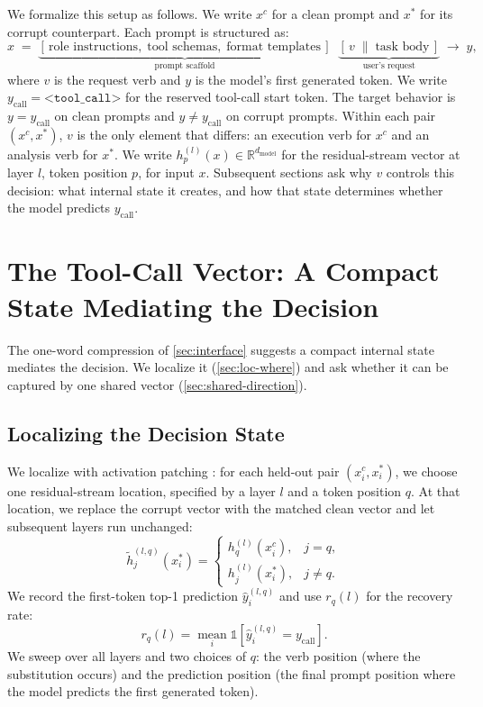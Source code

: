 \documentclass{article}
\begin{document}
We formalize this setup as follows. 
We write $x^c$ for a clean prompt and $x^*$ for its corrupt counterpart. 
Each prompt is structured as:
\begin{equation}
  x \;=\;
  \underbrace{[\,\text{role instructions},\;\text{tool schemas},\;\text{format templates}\,]}_{\text{prompt scaffold}}
  \;\;
  \underbrace{[\,v \;\|\; \text{task body}\,]}_{\text{user's request}}
  \;\longrightarrow\; y,
  \label{eq:prompt}
\end{equation}
where $v$ is the request verb and $y$ is the model's first generated token.
We write $y_{\mathrm{call}}=\texttt{<tool\_call>}$ for the reserved
tool-call start token. The target behavior is $y=y_{\mathrm{call}}$ on
clean prompts and $y\neq y_{\mathrm{call}}$ on corrupt prompts.
Within each pair $(x^c, x^*)$, $v$ is the only element that differs: an execution verb for $x^c$ and an analysis verb for $x^*$.
We write $h^{(l)}_p(x) \in \mathbb{R}^{d_{\text{model}}}$ for the residual-stream vector at layer $l$, token position $p$, for input $x$.
Subsequent sections ask why $v$ controls this decision: what internal state it creates, and how that state determines whether the model predicts $y_{\mathrm{call}}$.

\FloatBarrier

\section{The Tool-Call Vector: A Compact State Mediating the Decision}
\label{sec:vector-state}

The one-word compression of \autoref{sec:interface} suggests a compact
internal state mediates the decision. We localize it
(\autoref{sec:loc-where}) and ask whether it can be captured by one shared
vector (\autoref{sec:shared-direction}).

\subsection{Localizing the Decision State}
\label{sec:loc-where}

We localize with activation patching \citep{meng2022locating,
heimersheim2024patching}: for each held-out pair $(x_i^c,x_i^*)$, we
choose one residual-stream location, specified by a layer $l$ and a token
position $q$. At that location, we replace the corrupt vector with the
matched clean vector and let subsequent layers run unchanged:
\begin{equation}
  \tilde{h}^{(l,q)}_j(x_i^*) =
  \begin{cases}
    h^{(l)}_q(x_i^c), & j=q,\\
    h^{(l)}_j(x_i^*), & j\neq q.
  \end{cases}
  \label{eq:patch}
\end{equation}
We record the first-token top-1 prediction
$\hat{y}^{(l,q)}_i$ and use $r_q(l)$ for the recovery rate:
\[
  r_q(l)=\operatorname*{mean}_i
  \mathbb{1}\!\left[\hat{y}^{(l,q)}_i = y_{\mathrm{call}}\right].
\]
We sweep over all layers and two choices of $q$: the verb position
(where the substitution occurs) and the prediction position (the final
prompt position where the model predicts the first generated token).
\end{document}
